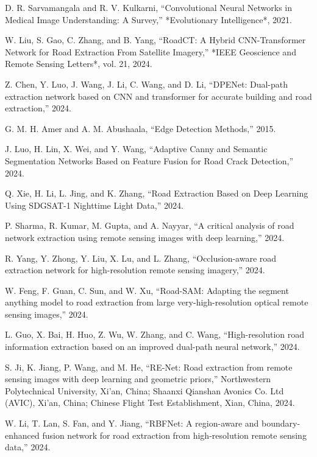 \documentclass[11pt]{article}
\begin{document}
\begin{thebibliography}{99}

D. R. Sarvamangala and R. V. Kulkarni, “Convolutional Neural Networks in Medical Image Understanding: A Survey,” *Evolutionary Intelligence*, 2021.

W. Liu, S. Gao, C. Zhang, and B. Yang, “RoadCT: A Hybrid CNN-Transformer Network for Road Extraction From Satellite Imagery,” *IEEE Geoscience and Remote Sensing Letters*, vol. 21, 2024.

Z. Chen, Y. Luo, J. Wang, J. Li, C. Wang, and D. Li, “DPENet: Dual-path extraction network based on CNN and transformer for accurate building and road extraction,” 2024.

G. M. H. Amer and A. M. Abushaala, “Edge Detection Methods,” 2015.

J. Luo, H. Lin, X. Wei, and Y. Wang, “Adaptive Canny and Semantic Segmentation Networks Based on Feature Fusion for Road Crack Detection,” 2024.

Q. Xie, H. Li, L. Jing, and K. Zhang, “Road Extraction Based on Deep Learning Using SDGSAT-1 Nighttime Light Data,” 2024.

P. Sharma, R. Kumar, M. Gupta, and A. Nayyar, “A critical analysis of road network extraction using remote sensing images with deep learning,” 2024.

R. Yang, Y. Zhong, Y. Liu, X. Lu, and L. Zhang, “Occlusion-aware road extraction network for high-resolution remote sensing imagery,” 2024.

W. Feng, F. Guan, C. Sun, and W. Xu, “Road-SAM: Adapting the segment anything model to road extraction from large very-high-resolution optical remote sensing images,” 2024.

L. Guo, X. Bai, H. Huo, Z. Wu, W. Zhang, and C. Wang, “High-resolution road information extraction based on an improved dual-path neural network,” 2024.

S. Ji, K. Jiang, P. Wang, and M. He, “RE-Net: Road extraction from remote sensing images with deep learning and geometric priors,” Northwestern Polytechnical University, Xi’an, China; Shaanxi Qianshan Avonics Co. Ltd (AVIC), Xi’an, China; Chinese Flight Test Establishment, Xian, China, 2024.

W. Li, T. Lan, S. Fan, and Y. Jiang, “RBFNet: A region-aware and boundary-enhanced fusion network for road extraction from high-resolution remote sensing data,” 2024.


\end{thebibliography}
\end{document}
